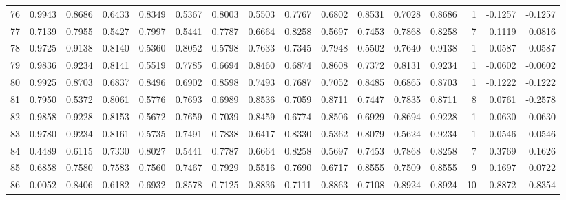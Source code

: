\begin{tabular}{lrrrrrrrrrrrrrrr}
76  &      0.9943 &  0.8686 &  0.6433 &  0.8349 &  0.5367 &  0.8003 &  0.5503 &  0.7767 &  0.6802 &  0.8531 &   0.7028 &     0.8686 &      1 &                   -0.1257 &                    -0.1257 \\
77  &      0.7139 &  0.7955 &  0.5427 &  0.7997 &  0.5441 &  0.7787 &  0.6664 &  0.8258 &  0.5697 &  0.7453 &   0.7868 &     0.8258 &      7 &                    0.1119 &                     0.0816 \\
78  &      0.9725 &  0.9138 &  0.8140 &  0.5360 &  0.8052 &  0.5798 &  0.7633 &  0.7345 &  0.7948 &  0.5502 &   0.7640 &     0.9138 &      1 &                   -0.0587 &                    -0.0587 \\
79  &      0.9836 &  0.9234 &  0.8141 &  0.5519 &  0.7785 &  0.6694 &  0.8460 &  0.6874 &  0.8608 &  0.7372 &   0.8131 &     0.9234 &      1 &                   -0.0602 &                    -0.0602 \\
80  &      0.9925 &  0.8703 &  0.6837 &  0.8496 &  0.6902 &  0.8598 &  0.7493 &  0.7687 &  0.7052 &  0.8485 &   0.6865 &     0.8703 &      1 &                   -0.1222 &                    -0.1222 \\
81  &      0.7950 &  0.5372 &  0.8061 &  0.5776 &  0.7693 &  0.6989 &  0.8536 &  0.7059 &  0.8711 &  0.7447 &   0.7835 &     0.8711 &      8 &                    0.0761 &                    -0.2578 \\
82  &      0.9858 &  0.9228 &  0.8153 &  0.5672 &  0.7659 &  0.7039 &  0.8459 &  0.6774 &  0.8506 &  0.6929 &   0.8694 &     0.9228 &      1 &                   -0.0630 &                    -0.0630 \\
83  &      0.9780 &  0.9234 &  0.8161 &  0.5735 &  0.7491 &  0.7838 &  0.6417 &  0.8330 &  0.5362 &  0.8079 &   0.5624 &     0.9234 &      1 &                   -0.0546 &                    -0.0546 \\
84  &      0.4489 &  0.6115 &  0.7330 &  0.8027 &  0.5441 &  0.7787 &  0.6664 &  0.8258 &  0.5697 &  0.7453 &   0.7868 &     0.8258 &      7 &                    0.3769 &                     0.1626 \\
85  &      0.6858 &  0.7580 &  0.7583 &  0.7560 &  0.7467 &  0.7929 &  0.5516 &  0.7690 &  0.6717 &  0.8555 &   0.7509 &     0.8555 &      9 &                    0.1697 &                     0.0722 \\
86  &      0.0052 &  0.8406 &  0.6182 &  0.6932 &  0.8578 &  0.7125 &  0.8836 &  0.7111 &  0.8863 &  0.7108 &   0.8924 &     0.8924 &     10 &                    0.8872 &                     0.8354 \\

\end{tabular}
